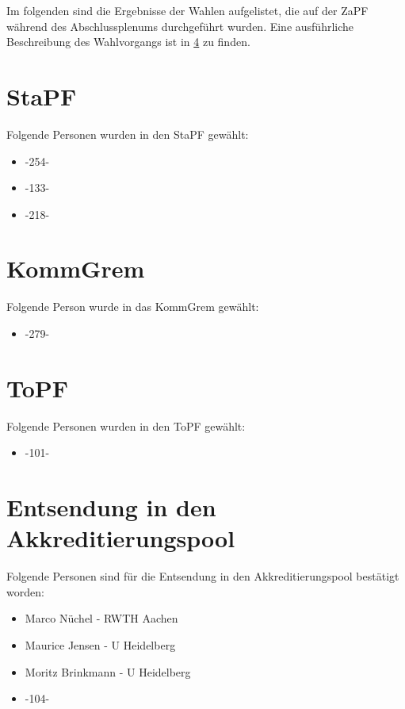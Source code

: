 
Im folgenden sind die Ergebnisse der Wahlen aufgelistet, die auf der ZaPF während des Abschlussplenums durchgeführt wurden.
Eine ausführliche Beschreibung des Wahlvorgangs ist in \ref{} zu finden.

    \section{StaPF}
      Folgende Personen wurden in den StaPF gewählt:
        \begin{itemize}
          \item -254-
          \item -133-
          \item -218-
        \end{itemize}

    \section{KommGrem}
      Folgende Person wurde in das KommGrem gewählt:
      \begin{itemize}
        \item -279-
      \end{itemize}

    \section{ToPF}
      Folgende Personen wurden in den ToPF gewählt:
      \begin{itemize}
        \item -101-
      \end{itemize}


    \section{Entsendung in den Akkreditierungspool}
      Folgende Personen sind für die Entsendung in den Akkreditierungspool bestätigt worden:
      \begin{itemize}
        \item Marco Nüchel - RWTH Aachen
        \item Maurice Jensen - U Heidelberg
        \item Moritz Brinkmann - U Heidelberg
        \item -104-
      \end{itemize}

